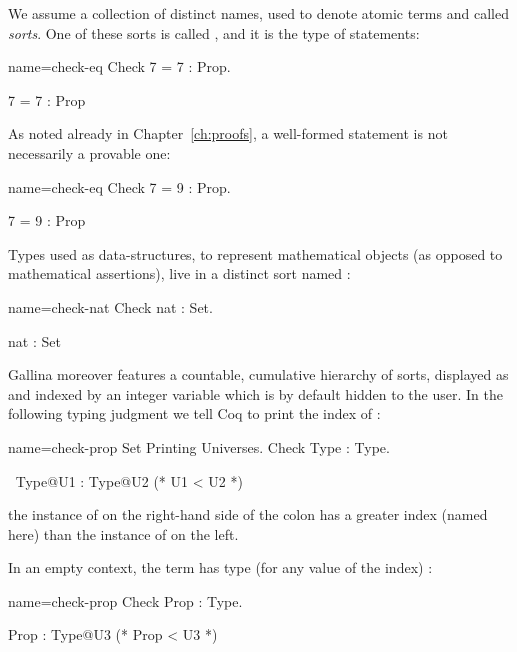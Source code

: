 We assume a collection of distinct names, used to denote atomic terms
and called \emph{sorts}.  One of these sorts is called , and it
is the type of statements:

\begin{coq-left}{name=check-eq}{}
Check 7 = 7 : Prop.
\end{coq-left}
\begin{coqout-right}
7 = 7 : Prop
\end{coqout-right}

As noted already in Chapter~\ref{ch:proofs}, a well-formed statement
is not necessarily a provable one:

\begin{coq-left}{name=check-eq}{}
Check 7 = 9 : Prop.
\end{coq-left}
\begin{coqout-right}
7 = 9 : Prop
\end{coqout-right}

Types used as data-structures, to represent mathematical objects (as
opposed to mathematical assertions), live in a distinct sort named
:

\begin{coq-left}{name=check-nat}{}
Check nat : Set.
\end{coq-left}
\begin{coqout-right}
nat : Set
\end{coqout-right}

Gallina moreover features a countable, cumulative hierarchy of sorts,
displayed as  and indexed by an integer variable which is by
default hidden to the user.  In the following typing judgment we tell Coq
to print the index of :

\begin{coq-left}{name=check-prop}{}
Set Printing Universes.
Check Type : Type.
\end{coq-left}
\begin{coqout-right}
$~$
Type@{U1} : Type@{U2} (* U1 < U2 *)
\end{coqout-right}

the instance of  on the right-hand side of the colon has a greater
index (named  here) than the instance of  on the left.

In an empty context,
the term  has type  (for any value of the index) :

\begin{coq-left}{name=check-prop}{}
Check Prop : Type.
\end{coq-left}
\begin{coqout-right}
Prop : Type@{U3} (* Prop < U3 *)
\end{coqout-right}

